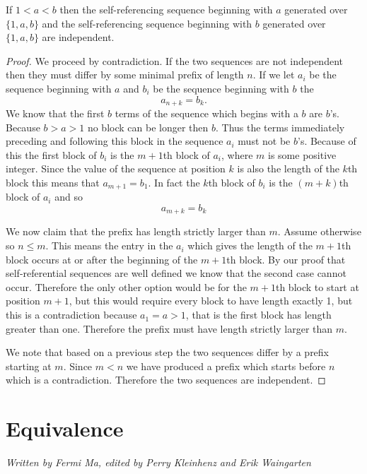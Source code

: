 \documentclass[runningheads,a4paper]{llncs}
\begin{document}
\begin{theorem}
\label{independentsequences}
If $1<a<b$ then the self-referencing sequence beginning with $a$ generated over $\{1, a, b\}$ and the self-referencing sequence beginning with $b$ generated over $\{1, a, b\}$ are independent.
\end{theorem}
\begin{proof}
We proceed by contradiction. If the two sequences are not independent then they must differ by some minimal prefix of length $n$. If we let $a_i$ be the sequence beginning with $a$ and $b_i$ be the sequence beginning with $b$ the
\begin{equation*}
a_{n+k} = b_{k}.
\end{equation*}
We know that the first $b$ terms of the sequence which begins with a $b$ are $b$'s. Because $b>a>1$ no block can be longer then $b$. Thus the terms immediately preceding and following this block in the sequence $a_i$ must not be $b$'s. Because of this the first block of $b_i$ is the $m+1$th block of $a_i$, where $m$ is some positive integer. Since the value of the sequence at position $k$ is also the length of the $k$th block this means that $a_{m+1}=b_1$. In fact the $k$th block of $b_i$ is the $(m+k)$th block of $a_i$ and so 
\begin{equation*}
a_{m+k} = b_k
\end{equation*}

We now claim that the prefix has length strictly larger than $m$. Assume otherwise so $n \leq m$. 
This means the entry in the $a_i$ which gives the length of the $m+1$th block occurs at or after the beginning of the $m+1$th block. By our proof that self-referential sequences are well defined we know that the second case cannot occur. Therefore the only other option would be for the $m+1$th block to start at position $m+1$, but this would require every block to have length exactly 1, but this is a contradiction because $a_1=a>1$, that is the first block has length greater than one. Therefore the prefix must have length strictly larger than $m$. 

We note that based on a previous step the two sequences differ by a prefix starting at $m$. Since $m<n$ we have produced a prefix which starts before $n$ which is a contradiction. Therefore the two sequences are independent. 
\end{proof}

\section{Equivalence}
\label{equivalence}
\emph{Written by Fermi Ma, edited by Perry Kleinhenz and Erik Waingarten}
\end{document}
